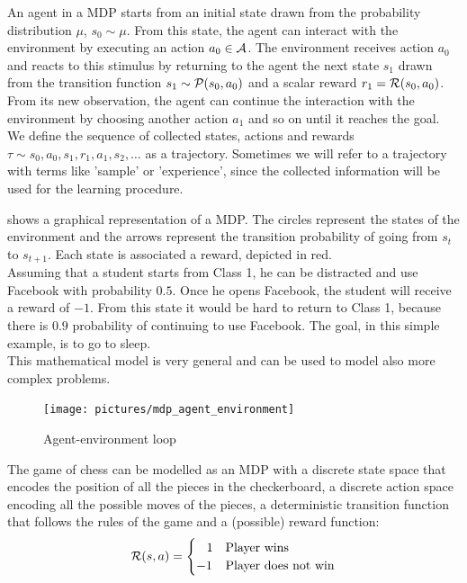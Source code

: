 An agent in a MDP starts from an initial state drawn from the probability distribution $\mu$, $s_0 \sim \mu$. From this state, the agent can interact with the environment by executing an action $a_0 \in \mathcal{A}$. The environment receives action $a_0$ and reacts to this stimulus by returning to the agent the next state $s_1$ drawn from the transition function $s_1 \sim \mathcal{P}(s_0, a_0)$ and a scalar reward $r_1 = \mathcal{R}(s_0, a_0)$. From its new observation, the agent can continue the interaction with the environment by choosing another action $a_1$ and so on until it reaches the goal. We define the  sequence of collected states, actions and rewards $\tau \sim s_0, a_0, s_1, r_1, a_1, s_2, \ldots$ as a trajectory. Sometimes we will refer to a trajectory with terms like 'sample' or 'experience', since the collected information will be used for the learning procedure.

 shows a graphical representation of a MDP. The circles represent the states of the environment and the arrows represent the transition probability of going from $s_t$ to $s_{t+1}$. Each state is associated a reward, depicted in red. \\
Assuming that a student starts from Class 1, he can be distracted and use Facebook with probability $0.5$. Once he opens Facebook, the student will receive a reward of $-1$. From this state it would be hard to return to Class 1, because there is $0.9$ probability of continuing to use Facebook. The goal, in this simple example, is to go to sleep.\\
This mathematical model is very general and can be used to model also more complex problems. 

\begin{figure}[t]
\centering
\texttt{[image: pictures/mdp\_agent\_environment]}
\caption{Agent-environment loop}
\end{figure}

\begin{example}[Chess]
The game of chess can be modelled as an MDP with a discrete state space that encodes the position of all the pieces in the checkerboard, a discrete action space encoding all the possible moves of the pieces, a deterministic transition function that follows the rules of the game and a (possible) reward function:
\begin{equation*}
\mathcal{R}(s,a) = \begin{cases}\,\,\,\,\,1 & \textrm{Player wins} \\ -1 & \textrm{Player does not win} \end{cases}
\end{equation*}
\end{example}


